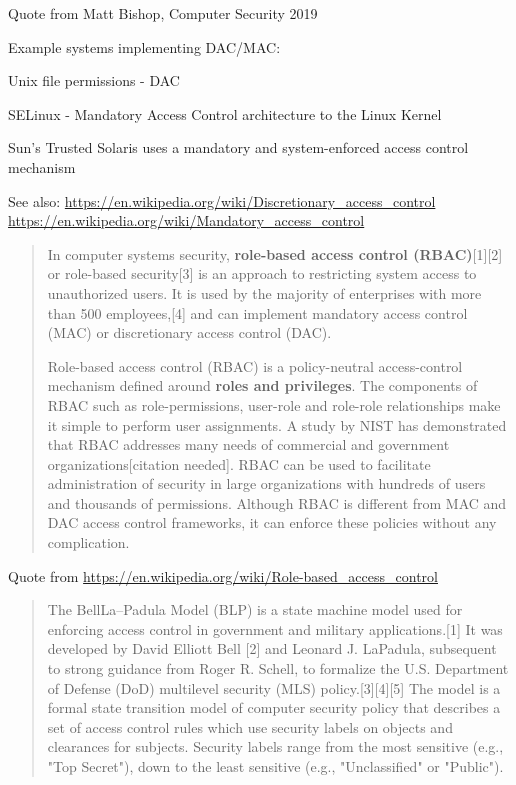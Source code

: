 \documentclass[Screen16to9,17pt]{foils}
\begin{document}
Quote from Matt Bishop, Computer Security 2019


Example systems implementing DAC/MAC:
\begin{list2}
\item Unix file permissions - DAC
\item SELinux - Mandatory Access Control architecture to the Linux Kernel
\item Sun's Trusted Solaris uses a mandatory and system-enforced access control mechanism
\end{list2}

See also:
\url{https://en.wikipedia.org/wiki/Discretionary_access_control}\\
\url{https://en.wikipedia.org/wiki/Mandatory_access_control}


\begin{quote}
In computer systems security, {\bf role-based access control (RBAC)}[1][2] or role-based security[3] is an approach to restricting system access to unauthorized users. It is used by the majority of enterprises with more than 500 employees,[4] and can implement mandatory access control (MAC) or discretionary access control (DAC).

Role-based access control (RBAC) is a policy-neutral access-control mechanism defined around {\bf roles and privileges}. The components of RBAC such as role-permissions, user-role and role-role relationships make it simple to perform user assignments. A study by NIST has demonstrated that RBAC addresses many needs of commercial and government organizations[citation needed]. RBAC can be used to facilitate administration of security in large organizations with hundreds of users and thousands of permissions. Although RBAC is different from MAC and DAC access control frameworks, it can enforce these policies without any complication.
\end{quote}
Quote from \url{https://en.wikipedia.org/wiki/Role-based_access_control}


\begin{quote}
The BellLa--Padula Model (BLP) is a state machine model used for enforcing access control in government and military applications.[1] It was developed by David Elliott Bell [2] and Leonard J. LaPadula, subsequent to strong guidance from Roger R. Schell, to formalize the U.S. Department of Defense (DoD) multilevel security (MLS) policy.[3][4][5] The model is a formal state transition model of computer security policy that describes a set of access control rules which use security labels on objects and clearances for subjects. Security labels range from the most sensitive (e.g., "Top Secret"), down to the least sensitive (e.g., "Unclassified" or "Public").
\end{quote}
\end{document}
